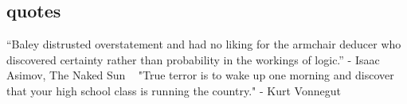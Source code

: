 
\begin{aside} %
\section{quotes}
“Baley distrusted overstatement and had no liking for the armchair deducer who discovered certainty rather than probability in the workings of logic.”
- Isaac Asimov, The Naked Sun
~
"True terror is to wake up one morning and discover that your high school class is running the country."
- Kurt Vonnegut
\end{aside}
